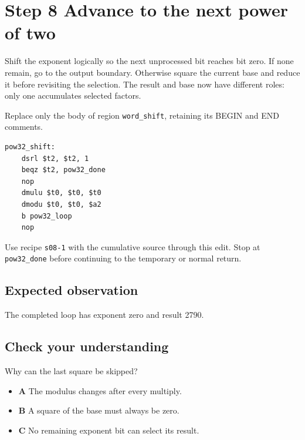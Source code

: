 \section{Step 8 Advance to the next power of two}\label{rsa-s08}

Shift the exponent logically so the next unprocessed bit reaches bit zero. If none remain, go to the output boundary. Otherwise square the current base and reduce it before revisiting the selection. The result and base now have different roles: only one accumulates selected factors.

Replace only the body of region \texttt{word\_shift}, retaining its BEGIN and END comments.

\begin{verbatim}
pow32_shift:
    dsrl $t2, $t2, 1
    beqz $t2, pow32_done
    nop
    dmulu $t0, $t0, $t0
    dmodu $t0, $t0, $a2
    b pow32_loop
    nop
\end{verbatim}

Use recipe \texttt{s08-1} with the cumulative source through this edit. Stop at \texttt{pow32\_done} before continuing to the temporary or normal return.

\subsection{Expected observation}
The completed loop has exponent zero and result 2790.

\subsection{Check your understanding}
Why can the last square be skipped?

\begin{itemize}
  \item \textbf{A} The modulus changes after every multiply.
  \item \textbf{B} A square of the base must always be zero.
  \item \textbf{C} No remaining exponent bit can select its result.
\end{itemize}
